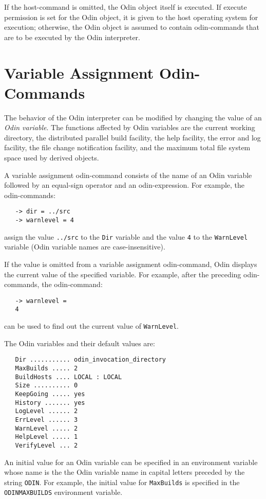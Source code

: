 \documentclass[hidelinks]{report}
\newcommand{\ex}{\tt}   %
\begin{document}
If the host-command is omitted, the Odin object itself is executed.
If execute permission is set for the Odin object,
it is given to the host operating system for execution;
otherwise, the Odin object is assumed to contain odin-commands that are 
to be executed by the Odin interpreter.


\section{Variable Assignment Odin-Commands}
\label{variable}

The behavior of the Odin interpreter can be modified by changing the value
of an {\em Odin variable}.
The functions affected by Odin variables are
the current working directory,
the distributed parallel build facility,
the help facility, the error and log facility,
the file change notification facility, and
the maximum total file system space used by derived objects.

A variable assignment odin-command consists of the name of an Odin variable
followed by an equal-sign operator and an odin-expression.
For example, the odin-commands:
\begin{verbatim}
   -> dir = ../src
   -> warnlevel = 4
\end{verbatim}
assign the value {\ex ../src} to the {\ex Dir} variable
and the value {\ex 4} to the {\ex WarnLevel} variable
(Odin variable names are case-insensitive).

If the value is omitted from a variable assignment odin-command,
Odin displays the current value of the specified variable.
For example, after the preceding odin-commands, the odin-command:
\begin{verbatim}
   -> warnlevel =
   4
\end{verbatim}
can be used to find out the current value of {\ex WarnLevel}.

The Odin variables and their default values are:
\begin{verbatim}
   Dir ........... odin_invocation_directory
   MaxBuilds ..... 2
   BuildHosts .... LOCAL : LOCAL
   Size .......... 0
   KeepGoing ..... yes
   History ....... yes
   LogLevel ...... 2
   ErrLevel ...... 3
   WarnLevel ..... 2
   HelpLevel ..... 1
   VerifyLevel ... 2
\end{verbatim}

An initial value for an Odin variable can be
specified in an environment variable whose name is the
the Odin variable name in capital letters preceded by the
string {\ex ODIN}.  For example, the initial value for {\ex MaxBuilds}
is specified in the {\ex ODINMAXBUILDS} environment variable.
\end{document}
